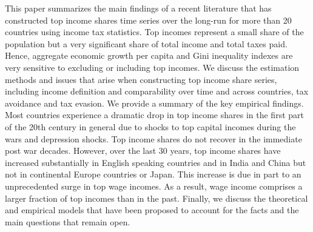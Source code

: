 This paper summarizes the main findings of a recent literature that has constructed top income shares time series over the long-run for more than 20 countries using income tax statistics. Top incomes represent a small share of the population but a very significant share of total income and total taxes paid. Hence, aggregate economic growth per capita and Gini inequality indexes are very sensitive to excluding or including top incomes. We discuss the estimation methods and issues that arise when constructing top income share series, including income definition and comparability over time and across countries, tax avoidance and tax evasion. We provide a summary of the key empirical findings. Most countries experience a dramatic drop in top income shares in the first part of the 20th century in general due to shocks to top capital incomes during the wars and depression shocks. Top income shares do not recover in the immediate post war decades. However, over the last 30 years, top income shares have increased substantially in English speaking countries and in India and China but not in continental Europe countries or Japan. This increase is due in part to an unprecedented surge in top wage incomes. As a result, wage income comprises a larger fraction of top incomes than in the past. Finally, we discuss the theoretical and empirical models that have been proposed to account for the facts and the main questions that remain open.
